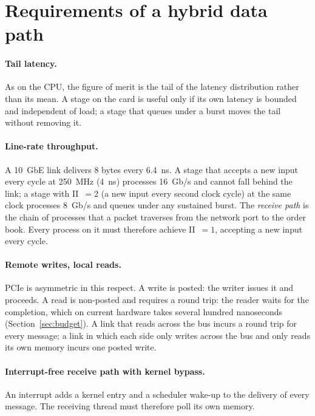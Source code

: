 \documentclass[11pt]{article}
\begin{document}
\section{Requirements of a hybrid data path}
\label{sec:requirements}

\paragraph{Tail latency.} As on the CPU, the figure of merit is the tail of the
latency distribution rather than its mean. A stage on the card is useful only
if its own latency is bounded and independent of load; a stage that queues
under a burst moves the tail without removing it.

\paragraph{Line-rate throughput.} A 10~GbE link delivers 8 bytes every 6.4~ns.
A stage that accepts a new input every cycle at 250~MHz (4~ns) processes
16~Gb/s and cannot fall behind the link; a stage with II~$=2$ (a new input every second clock cycle) at the same clock
processes 8~Gb/s and queues under any sustained burst. The \emph{receive path}
is the chain of processes that a packet traverses from the network port to the
order book. Every process on it must therefore achieve II~$=1$, accepting a new
input every cycle.

\paragraph{Remote writes, local reads.} PCIe is asymmetric in this respect. A
write is posted: the writer issues it and proceeds. A read is non-posted and
requires a round trip: the reader waits for the completion, which on current
hardware takes several hundred nanoseconds (Section~\ref{sec:budget}). A link
that reads across the bus incurs a round trip for every message; a link in
which each side only writes across the bus and only reads its own memory incurs
one posted write.

\paragraph{Interrupt-free receive path with kernel bypass.} An interrupt adds
a kernel entry and a scheduler wake-up to the delivery of every message. The
receiving thread must therefore poll its own memory.
\end{document}
